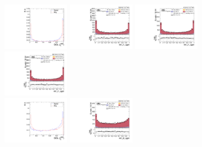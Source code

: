 \begin{figure}[!ht]
  \centering
  \includegraphics[width=0.25\textwidth]{analysis_plots/tmva_plots/zjj_BDTG14_vbf1_AK4_qgid.pdf} \hspace{-10pt}
  \includegraphics[width=0.25\textwidth]{analysis_plots/2016_zjj/cr_vjets_l/vbf_j1_qgid.pdf} \hspace{-10pt}
  \includegraphics[width=0.25\textwidth]{analysis_plots/2017_zjj/cr_vjets_l/vbf_j1_qgid.pdf} \hspace{-10pt}
  \includegraphics[width=0.25\textwidth]{analysis_plots/2018_zjj/cr_vjets_l/vbf_j1_qgid.pdf} \hspace{-10pt}  \\
  \includegraphics[width=0.25\textwidth]{analysis_plots/tmva_plots/zjj_BDTG14_vbf2_AK4_qgid.pdf} \hspace{-10pt}
  \includegraphics[width=0.25\textwidth]{analysis_plots/2016_zjj/cr_vjets_l/vbf_j2_qgid.pdf} \hspace{-10pt}

\end{figure}
